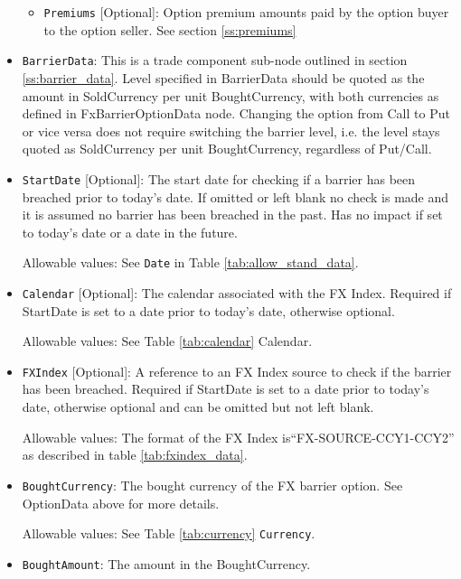 \begin{itemize}
\begin{itemize}
\item \lstinline!Premiums! [Optional]: Option premium amounts paid by the option buyer to the option seller. See section \ref{ss:premiums}

\end{itemize}



\item \lstinline!BarrierData!: This is a trade component sub-node outlined in section \ref{ss:barrier_data}.
Level specified in BarrierData should be quoted as the amount in SoldCurrency per unit BoughtCurrency, with both currencies as defined in FxBarrierOptionData node.
Changing the option from Call to Put or vice versa does not require switching the barrier level, i.e. the level stays quoted as SoldCurrency per unit BoughtCurrency, regardless of Put/Call.

\item \lstinline!StartDate! [Optional]: The start date for checking if a barrier has been breached prior to today's date.  If omitted or left blank no check is made and it is assumed no barrier has been breached in the past. Has no impact if set to today's date or a date in the future.

Allowable values:  See \lstinline!Date! in Table \ref{tab:allow_stand_data}.

\item \lstinline!Calendar! [Optional]: The calendar associated with the FX Index. Required if StartDate is set to a date prior to today's date, otherwise optional.

Allowable values: See Table \ref{tab:calendar} Calendar.

\item \lstinline!FXIndex! [Optional]: A reference to an FX Index source to check if the barrier has been breached. Required if StartDate is set to a date prior to today's date, otherwise optional and can be omitted but not left blank.

Allowable values:  The format of the FX Index is``FX-SOURCE-CCY1-CCY2'' as described in table \ref{tab:fxindex_data}. 

\item \lstinline!BoughtCurrency!: The bought currency of the FX barrier option. See OptionData above for more details.

Allowable values:  See Table \ref{tab:currency} \lstinline!Currency!.

\item \lstinline!BoughtAmount!: The amount in the BoughtCurrency.  


\end{itemize}
